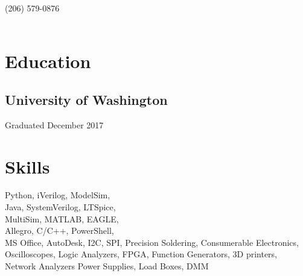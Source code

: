 \documentclass[]{hieudo-build}
\begin{document}
%
%
{
	\phone \hspace{0.1mm} (206) 579-0876\\
	\\
}
    
%
%
\begin{minipage}[t]{0.36\textwidth} 

\section{Education} 

\subsection{University of Washington}
Graduated December 2017 \\
\sectionsep

\section{Skills}
Python, iVerilog, ModelSim, \\Java, SystemVerilog, LTSpice, \\MultiSim, MATLAB, EAGLE, \\Allegro, C/C++, PowerShell, \\MS Office, AutoDesk, I2C, SPI, Precision Soldering, Consumerable Electronics, Oscilloscopes, Logic Analyzers, FPGA, Function Generators, 3D printers, Network Analyzers
Power Supplies, Load Boxes, DMM

\sectionsep

\end{minipage}
\end{document}

